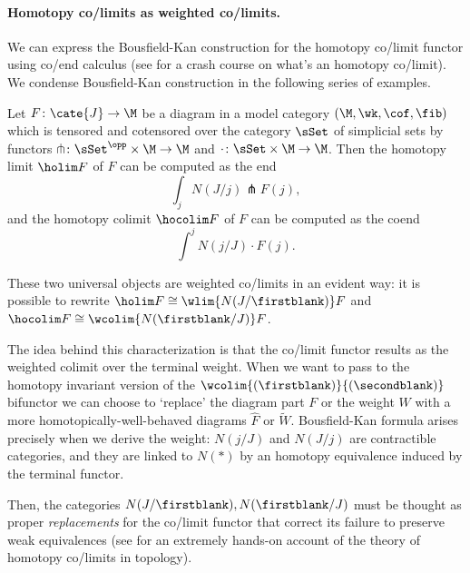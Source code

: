 \paragraph{\bf Homotopy co/limits as weighted co/limits.}
We can express the Bousfield\hyp{}Kan construction for the homotopy co/limit functor using co/end calculus (see  for a crash course on what's an homotopy co/limit). We condense Bousfield\hyp{}Kan construction in the following series of examples.
\begin{theorem}
Let $F \colon \cate{J}\to \M$ be a diagram in a model category $(\M, \wk,\cof,\fib)$ which is tensored and cotensored over the category $\sSet$ of simplicial sets by functors $\pitchfork \colon \sSet^\opp\times \M \to \M$ and $\cdot \colon \sSet \times \M \to \M$. Then the homotopy limit $\holim F$ of $F$ can be computed as the end
\[
\int_j N(J/j)\pitchfork F(j),
\]
and the homotopy colimit $\hocolim F$ of $F$ can be computed as the coend
\[
\int^j N(j/J) \cdot F(j).
\]
\end{theorem}
\begin{remark}
These two universal objects are weighted co/limits in an evident way: it is possible to rewrite $\holim F\cong \wlim{N(J/\firstblank)}F$ and $\hocolim F\cong \wcolim{N(\firstblank/J)}F$.

The idea behind this characterization is that the co/limit functor results as the weighted colimit over the terminal weight. When we want to pass to the homotopy invariant version of the $\wcolim{(\firstblank)}{(\secondblank)}$ bifunctor we can choose to `replace' the diagram part $F$ or the weight $W$ with a more homotopically\hyp{}well\hyp{}behaved diagrams $\hat F$ or $\tilde W$. Bousfield\hyp{}Kan formula arises precisely when we derive the weight: $N(j/J)$ and $N(J/j)$ are contractible categories, and they are linked to $N(*)$ by an homotopy equivalence induced by the terminal functor.

Then, the categories $N(J/\firstblank),N(\firstblank/J)$ must be thought as proper \emph{replacements} for the co/limit functor that correct its failure to preserve weak equivalences (see \cite[\achap\textbf{6}]{strom2011modern} for an extremely hands-on account of the theory of homotopy co/limits in topology).
\end{remark}
